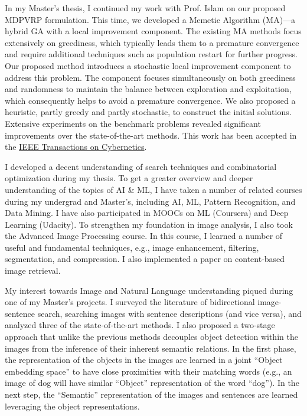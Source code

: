 \documentclass[12pt]{article}
\begin{document}
In my Master's thesis, I continued my work with Prof. Islam on our proposed MDPVRP formulation. This time, we developed a Memetic Algorithm (MA)---a hybrid GA with a local improvement component. The existing MA methods focus extensively on greediness, which typically leads them to a premature convergence and require additional techniques such as population restart for further progress. Our proposed method introduces a stochastic local improvement component to address this problem. The component focuses simultaneously on both greediness and randomness to maintain the balance between exploration and exploitation, which consequently helps to avoid a premature convergence. We also proposed a heuristic, partly greedy and partly stochastic, to construct the initial solutions. Extensive experiments on the benchmark problems revealed significant improvements over the state-of-the-art methods. This work has been accepted in the \href{http://ieeexplore.ieee.org/document/7835722/}{IEEE Transactions on Cybernetics}. 

I developed a decent understanding of search techniques and combinatorial optimization during my thesis. To get a greater overview and deeper understanding of the topics of AI \& ML, I have taken a number of related courses during my undergrad and Master's, including AI, ML, Pattern Recognition, and Data Mining. I have also participated in MOOCs on ML (Coursera) and Deep Learning (Udacity). To strengthen my foundation in image analysis, I also took the Advanced Image Processing course. In this course, I learned a number of useful and fundamental techniques, e.g., image enhancement, filtering, segmentation, and compression. I also implemented a paper on content-based image retrieval.


My interest towards Image and Natural Language understanding piqued during one of my Master's projects. I surveyed the literature of bidirectional image-sentence search, searching images with sentence descriptions (and vice versa), and analyzed three of the state-of-the-art methods. I also proposed a two-stage approach that unlike the previous methods decouples object detection within the images from the inference of their inherent semantic relations. In the first phase, the representation of the objects in the images are learned in a joint ``Object embedding space'' to have close proximities with their matching words (e.g., an image of dog will have similar ``Object'' representation of the word ``dog''). In the next step, the ``Semantic'' representation of the images and sentences are learned leveraging the object representations. 
\end{document}
